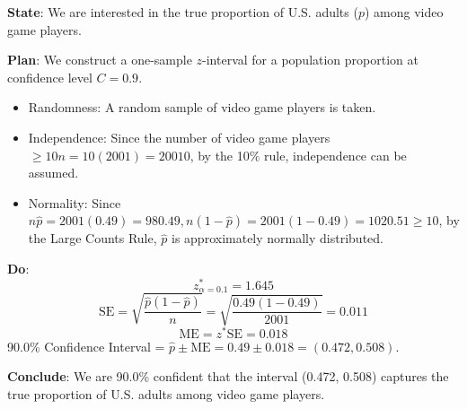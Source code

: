 \documentclass{article}
\begin{document}
\textbf{State}: We are interested in the true proportion of U.S. adults (\(p\)) among video game players.
\newline

\textbf{Plan}: We construct a one-sample \(z\)-interval for a population proportion at confidence level \(C = 0.9\).
\begin{itemize}
\item    Randomness: A random sample of video game players is taken.

\item    Independence: Since the number of video game players \(\geq 10n= 10(2001) = 20010\), by the 10\% rule, independence can be assumed.

\item    Normality: Since \(n\hat{p} = 2001(0.49) = 980.49, n(1-\hat{p}) = 2001(1- 0.49) = 1020.51\geq 10 \), by the Large Counts Rule, \(\hat{p}\) is approximately normally distributed.
\end{itemize}\newline

\textbf{Do}: $$z^*_{\alpha = 0.1} = 1.645$$
$$\textrm{SE} = \sqrt{\frac{\hat{p}(1-\hat{p})}{n}} = \sqrt{\frac{0.49(1 - 0.49)}{2001}} = 0.011$$
$$\textrm{ME} = z^* \textrm{SE} = 0.018$$
90.0\% Confidence Interval = \(\hat{p} \pm \textrm{ME} = 0.49\pm0.018 = (0.472, 0.508)\).\newline

\textbf{Conclude}: We are 90.0\% confident that the interval (0.472, 0.508) captures the true proportion of U.S. adults among video game players.
\end{document}
